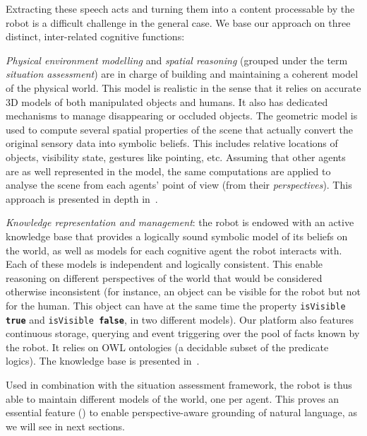 Extracting these speech acts and turning them into a content processable by the
robot is a difficult challenge in the general case. We base our approach on
three distinct, inter-related cognitive functions:

\begin{inparaenum}[\itshape 1)]

\item \emph{Physical environment modelling} and \emph{spatial reasoning}
(grouped under the term \emph{situation
assessment})  are in charge of building and
maintaining a coherent model of the physical world. This model is realistic in
the sense that it relies on accurate 3D models of both manipulated objects and
humans. It also has dedicated mechanisms to manage disappearing or occluded
objects.  The geometric model is used to compute several spatial properties of
the scene that actually convert the original sensory data into symbolic
beliefs. This includes relative locations of objects, visibility state,
gestures like pointing, etc.  Assuming that other agents are as well
represented in the model, the same computations are applied to analyse the
scene from each agents' point of view (\ie from their \emph{perspectives}).
This approach is presented in depth in~\cite{Sisbot2011}.

\item \emph{Knowledge representation and management}: the robot is endowed with
an active knowledge base that provides a logically sound symbolic model of its
beliefs on the world, as well as models for each cognitive agent the robot
interacts with. Each of these models is independent and logically consistent.
This enable reasoning on different perspectives of the world that would be
considered otherwise inconsistent (for instance, an object can be visible for
the robot but not for the human. This object can have at the same time the
property {\tt isVisible \textbf{true}} and {\tt isVisible \textbf{false}}, in
two different models).  Our platform also features continuous storage, querying
and event triggering over the pool of facts known by the robot. It relies on
OWL ontologies (a decidable subset of the predicate logics). The knowledge base
is presented in~\cite{Lemaignan2010}.

Used in combination with the situation assessment framework, the robot is thus
able to maintain different models of the world, one per agent. This proves an
essential feature (\cite{Roy2005, Kruijff2010}) to enable perspective-aware
grounding of natural language, as we will see in next sections.


\end{inparaenum}
